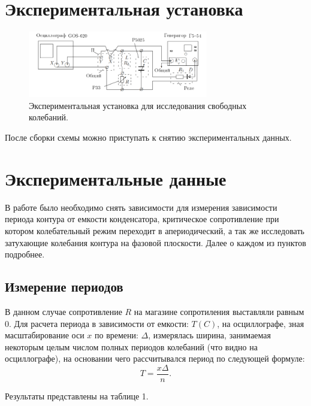 \documentclass[a4paper, 14pt]{extarticle}%
\newcommand\ECaption[1]{%
     \captionsetup{font=footnotesize}%
     \caption{#1}}
\begin{document}
\section*{Экспериментальная установка}
\begin{figure}[h!]
\begin{center}
\includegraphics[width=0.7\textwidth]{ust}
\end{center}
\ECaption{Экспериментальная установка для исследования свободных колебаний.}
\end{figure}

После сборки схемы можно приступать к снятию экспериментальных данных.

\section*{Экспериментальные данные}

В работе было необходимо снять зависимости для измерения зависимости периода контура от емкости конденсатора, критическое сопротивление при котором колебательный режим переходит в апериодический, а так же исследовать затухающие колебания контура на фазовой плоскости. Далее о каждом из пунктов подробнее. 

\subsection*{Измерение периодов}

В данном случае сопротивление $R$ на магазине сопротиления выставляли равным $0$. Для расчета периода в зависимости от емкости: $T(C)$, на осциллографе, зная масштабирование оси $x$ по времени: $\Delta$, измерялась ширина, занимаемая некоторым целым числом полных периодов колебаний (что видно на осциллографе), на основании чего рассчитывался период по следующей формуле:
\begin{equation}
T = \dfrac{x\Delta}{n}.
\end{equation} 

Результаты представлены на таблице 1.
\end{document}

